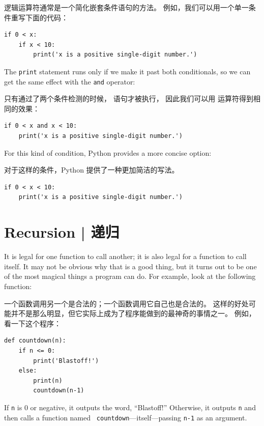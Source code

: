 {{{{逻辑运算符通常是一个简化嵌套条件语句的方法。
例如，我们可以用一个单一条件重写下面的代码：

\begin{lstlisting}
if 0 < x:
    if x < 10:
        print('x is a positive single-digit number.')
\end{lstlisting}

%
The {\tt print} statement runs only if we make it past both
conditionals, so we can get the same effect with the {\tt and} operator:

只有通过了两个条件检测的时候，  语句才被执行，
因此我们可以用  运算符得到相同的效果：


\begin{lstlisting}
if 0 < x and x < 10:
    print('x is a positive single-digit number.')
\end{lstlisting}

For this kind of condition, Python provides a more concise option:

对于这样的条件，Python 提供了一种更加简洁的写法。

\begin{lstlisting}
if 0 < x < 10:
    print('x is a positive single-digit number.')
\end{lstlisting}


\section{Recursion  |  递归}
\label{recursion}
  

It is legal for one function to call another;
it is also legal for a function to call itself.  It may not be obvious
why that is a good thing, but it turns out to be one of the most
magical things a program can do.
For example, look at the following function:

一个函数调用另一个是合法的；一个函数调用它自己也是合法的。
这样的好处可能并不是那么明显，但它实际上成为了程序能做到的最神奇的事情之一。
例如，看一下这个程序：

\begin{lstlisting}
def countdown(n):
    if n <= 0:
        print('Blastoff!')
    else:
        print(n)
        countdown(n-1)
\end{lstlisting}

%
If {\tt n} is 0 or negative, it outputs the word, ``Blastoff!''
Otherwise, it outputs {\tt n} and then calls a function named {\tt
countdown}---itself---passing {\tt n-1} as an argument.

}}}}
